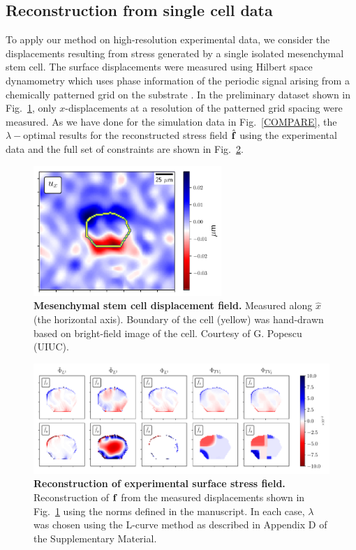 \documentclass[aps,prl,reprint,groupedaddress,twocolumn]{revtex4-1}
\def\f{{\bf f}}
\begin{document}
\subsection{Reconstruction from single cell data}

To apply our method on high-resolution experimental data, we consider
the displacements resulting from stress generated by a single isolated
mesenchymal stem cell. The surface displacements were measured using
Hilbert space dynamometry which uses phase information of the periodic
signal arising from a chemically patterned grid on the substrate
\cite{POPESCU}.  In the preliminary dataset shown in Fig.~\ref{DATA},
only $x$-displacements at a resolution of the patterned grid spacing
were measured.  As we have done for the simulation data in
Fig.~\ref{COMPARE}, the $\lambda-$optimal results for the
reconstructed stress field $\hat{\f}$ using the experimental data and
the full set of constraints are shown in Fig.~\ref{DATA2}.



\begin{figure}[h!]
\includegraphics[width=2.8in]{fig8}
\caption{\textbf{Mesenchymal stem cell displacement field.} Measured
  along $\hat{x}$ (the horizontal axis). Boundary of the cell (yellow)
  was hand-drawn based on bright-field image of the cell. Courtesy of
  G. Popescu (UIUC).}
\label{DATA}
\end{figure}
%

\begin{figure}
\includegraphics[width=\linewidth]{fig9}
\caption{\textbf{Reconstruction of experimental surface stress field.}
  Reconstruction of $\f$ from the measured displacements shown in
  Fig.~\ref{DATA} using the norms defined in the manuscript. In each
  case, $\lambda$ was chosen using the L-curve method as described in 
  Appendix D of the Supplementary Material.}
\label{DATA2}
\end{figure}
\end{document}
